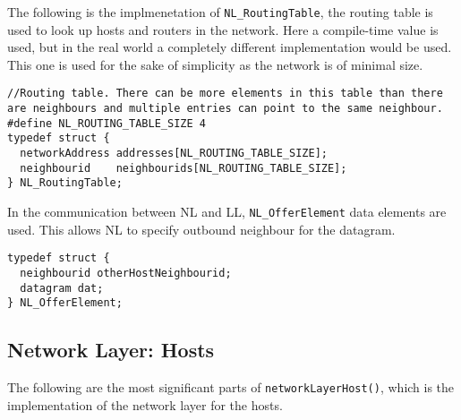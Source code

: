 The following is the implmenetation of \texttt{NL\_RoutingTable}, the routing table is used to look up hosts and routers in the network.
Here a compile-time value is used, but in the real world a completely different implementation would be used. This one is used for the sake of simplicity as the network is of minimal size.
\begin{lstlisting}
//Routing table. There can be more elements in this table than there are neighbours and multiple entries can point to the same neighbour.
#define NL_ROUTING_TABLE_SIZE 4
typedef struct {
  networkAddress addresses[NL_ROUTING_TABLE_SIZE];
  neighbourid    neighbourids[NL_ROUTING_TABLE_SIZE];
} NL_RoutingTable;
\end{lstlisting}


In the communication between NL and LL, \texttt{NL\_OfferElement} data elements are used. This allows NL to specify outbound neighbour for the datagram.
\begin{lstlisting}
typedef struct {
  neighbourid otherHostNeighbourid;
  datagram dat;
} NL_OfferElement;
\end{lstlisting}


\subsection{Network Layer: Hosts}

The following are the most significant parts of  \texttt{networkLayerHost()}, which is the implementation of the network layer for the hosts.

